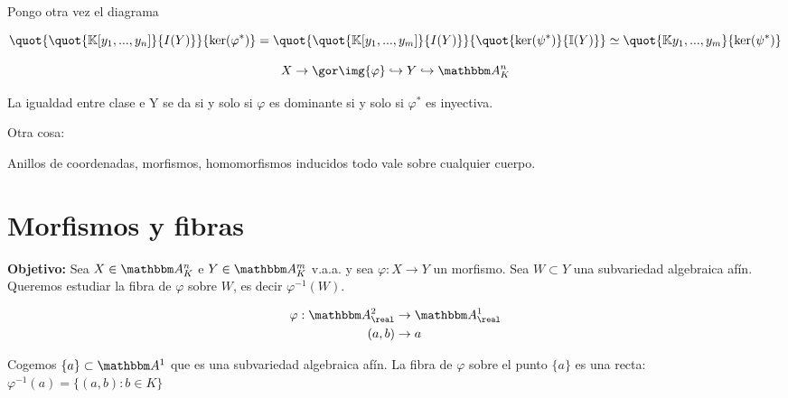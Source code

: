 Pongo otra vez el diagrama


$$ \quot{\quot{\K[y_1,...,y_n]}{I(Y)}}{\ker(\varphi^*)}=\quot{\quot{\K[y_1,...,y_m]}{I(Y)}}{\quot{\ker(\psi^*)}{\I(Y)}} \simeq \quot{\K{y_1,...,y_m}}{\ker(\psi^*)} $$

$$ X \rightarrow \cls{\img{\varphi}} \hookrightarrow Y \hookrightarrow \Akn $$

La igualdad entre clase e Y se da si y solo si $\varphi$ es dominante si y solo si $\varphi^*$ es inyectiva.

Otra cosa:

Anillos de coordenadas, morfismos, homomorfismos inducidos todo vale sobre cualquier cuerpo.


\section{Morfismos y fibras}

\textbf{Objetivo:} Sea $X \in \Akn$ e $Y \in \A^m_K$ v.a.a. y sea $\varphi: X \rightarrow Y$ un morfismo. Sea $W \subset Y$ una subvariedad algebraica afín. Queremos estudiar la fibra de $\varphi$ sobre $W$, es decir $\varphi^{-1}(W)$.

\begin{example}
	\begin{align*}
	\varphi: \A^2_{\real} & \rightarrow \A^1_{\real} \\
	(a,b) & \rightarrow a
	\end{align*}

	Cogemos $\{a\} \subset \A^1$ que es una subvariedad algebraica afín. La fibra de $\varphi$ sobre el punto $\{a\}$ es una recta: $\varphi^{-1}(a)=\{ (a,b):b \in K \}$
\end{example}

